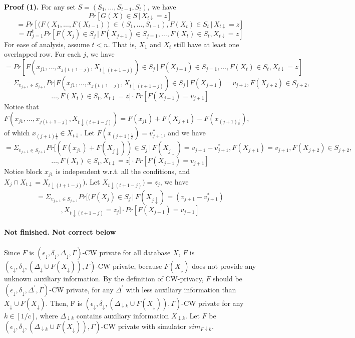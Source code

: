 \documentclass[11pt]{article}
\begin{document}
{\bf Proof (1). }
For any set $S=(S_{1}, \dots, S_{t-1}, S_{t})$, we have
\[
Pr[G(X) \in S\,|\, X_{t\downarrow} =z]
\]
\[
=Pr[(F(X_{1}, \dots, F(X_{t-1})) \in (S_{1},\dots , S_{t-1}), F(X_{t}) \in S_{t}\,|\, X_{t\downarrow} =z]
\]
\[
=\Pi_{j=1}^{t} Pr[F(X_{j}) \in S_{j}\,|\, F(X_{j+1}) \in S_{j=1} , \dots, F(X_{t}) \in S_{t}, X_{t\downarrow}=z]
\]
For ease of analysis, assume $t < n$. That is, $X_{1}$ and $X_{t}$ still have at least one overlapped row. For each $j$, we have
\[
=Pr[F(x_{j1}, \dots , x_{j(t+1-j)},  X_{t\downarrow (t+1-j)}) \in S_{j} \,|\, F(X_{j+1}) \in S_{j=1} , \dots, F(X_{t}) \in S_{t}, X_{t\downarrow}=z]
\]
\[
=\Sigma_{v_{j+1} \in S_{j+1}} Pr[F(x_{j1}, \dots , x_{j(t+1-j)},  X_{t\downarrow (t+1-j)}) \in S_{j} \,|\, F(X_{j+1})=v_{j+1} , F(X_{j+2})\in S_{j+2},  
\]
\[
\dots, F(X_{t}) \in S_{t},X_{t\downarrow}=z] \cdot Pr[F(X_{j+1})=v_{j+1}]
\]
Notice that $F(x_{j1}, \dots , x_{j(t+1-j)},  X_{t\downarrow (t+1-j)}) = F(x_{j1}) + F(X_{j+1}) - F(x_{(j+1)\frac{1}{c}})$, of which $x_{(j+1)\frac{1}{c}} \in X_{t\downarrow}$. Let $F(x_{(j+1)\frac{1}{c}}) = v_{j+1}^{*}$, and we have
\[
=\Sigma_{v_{j+1} \in S_{j+1}} Pr[(F(x_{j1}) + F(X_{j\downarrow})  ) \in S_{j} \,|\, F(X_{j\downarrow}) =v_{j+1} - v_{j+1}^{*},  F(X_{j+1})=v_{j+1} , F(X_{j+2})\in S_{j+2},  
\]
\[
\dots, F(X_{t}) \in S_{t},X_{t\downarrow}=z] \cdot Pr[F(X_{j+1})=v_{j+1}]
\]
Notice block $x_{j1}$ is independent w.r.t. all the conditions, and $X_{j} \cap X_{t\downarrow} = X_{t\downarrow (t+1-j)})$. Let $X_{t\downarrow (t+1-j)}) =z_{j}$, we have
\[
=\Sigma_{v_{j+1} \in S_{j+1}} Pr[(F(X_{j}  ) \in S_{j} \,|\, F(X_{j\downarrow}) =(v_{j+1} - v_{j+1}^{*})
\]
\[
,  X_{t\downarrow (t+1-j)}=z_{j}] \cdot Pr[F(X_{j+1})=v_{j+1}]
\]
\\
{\bf Not finished. Not correct below}
\\
\\
Since $F$ is $(\epsilon_{\downarrow}, \delta_{\downarrow}, \Delta_{\downarrow}, \Gamma)$-CW private for all database $X$, $F$ is $(\epsilon_{\downarrow}, \delta_{\downarrow}, (\Delta_{\downarrow} \cup F(X_\downarrow)), \Gamma)$-CW private, because $F(X_{\downarrow})$ does not provide any unknown auxiliary information. By the definition of CW-privacy, $F$ should be $(\epsilon_{\downarrow}, \delta_{\downarrow}, \Delta^{'}, \Gamma)$-CW private, for any $\Delta^{'}$ with less auxiliary information than $X_{\downarrow} \cup F(X_{\downarrow})$. Then, F is $(\epsilon_{\downarrow}, \delta_{\downarrow}, (\Delta_{\downarrow k} \cup F(X_\downarrow)), \Gamma)$-CW private for any $k \in [1/c]$, where $\Delta_{\downarrow k}$ contains auxiliary information $X_{\downarrow k}$. Let $F$ be $(\epsilon_{\downarrow}, \delta_{\downarrow}, (\Delta_{\downarrow k} \cup F(X_\downarrow)), \Gamma)$-CW private with simulator $sim_{F\downarrow k}$.
\end{document}
